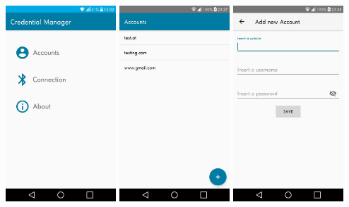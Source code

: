 \documentclass{beamer}
\begin{document}
\begin{frame}{}
\vfill
\centering
\includegraphics[width=0.31\textwidth]{images/MainActivityNew.jpg}
\hspace{0.1cm}
\includegraphics[width=0.31\textwidth]{images/ShowAccountsActivity.jpg}
\hspace{0.1cm}
\includegraphics[width=0.31\textwidth]{images/AddAccountActivity.jpg}
\vfill
%
\note{
}
\end{frame}
\end{document}
